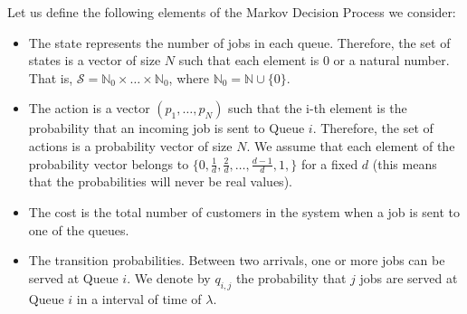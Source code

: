 \documentclass[a4paper,11pt]{article}
\begin{document}
Let us define the following elements of the Markov Decision Process we consider:
\begin{itemize}
\item The state represents the number of jobs in each queue. Therefore, the set of states is a vector of size $N$ such that each element is $0$ or a natural number. That is, $\mathcal S=\mathbb N_0\times \dots \times \mathbb N_0$, where $\mathbb N_0=\mathbb N \cup \{0\}$.
\item The action is a vector $(p_1,\dots,p_N)$ such that the i-th element is the probability that an incoming job is sent to Queue $i$. Therefore, the set of actions is a probability vector of size $N$. We assume that each element of the probability vector belongs to $\{0,\frac{1}{d},\frac{2}{d},\dots,\frac{d-1}{d},1,\}$ for a fixed $d$ (this means that the probabilities will never be real values).
\item The cost is the total number of customers in the system when a job is sent to one of the queues.
\item The transition probabilities. Between two arrivals, one or more jobs can be served at Queue $i$. We denote by $q_{i,j}$ the probability that
$j$ jobs are served at Queue $i$ in a interval of time of $\lambda$. 
\end{itemize}
\end{document}
